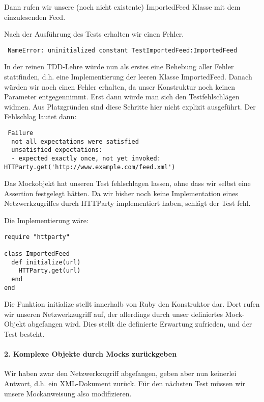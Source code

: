 Dann rufen wir unsere (noch nicht existente) ImportedFeed Klasse mit dem einzulesenden Feed.
\tddred

Nach der Ausführung des Tests erhalten wir einen Fehler. 
\begin{lstlisting}
 NameError: uninitialized constant TestImportedFeed:ImportedFeed
\end{lstlisting}
In der reinen TDD-Lehre würde nun als erstes eine Behebung aller Fehler stattfinden, d.h. eine Implementierung der leeren Klasse ImportedFeed. Danach würden wir noch einen Fehler erhalten, da unser Konstruktur noch keinen Parameter entgegennimmt. Erst dann würde man sich den Testfehlschlägen widmen. Aus Platzgründen sind diese Schritte hier nicht explizit ausgeführt. Der Fehlschlag lautet dann:

\begin{lstlisting}
 Failure
  not all expectations were satisfied
  unsatisfied expectations:
  - expected exactly once, not yet invoked: HTTParty.get('http://www.example.com/feed.xml')
\end{lstlisting}
Das Mockobjekt hat unseren Test fehlschlagen lassen, ohne dass wir selbst eine Assertion festgelegt hätten. Da wir bisher noch keine Implementation eines Netzwerkzugriffes durch HTTParty implementiert haben, schlägt der Test fehl.

Die Implementierung wäre:
\begin{lstlisting}
require "httparty"

class ImportedFeed
  def initialize(url)
    HTTParty.get(url)
  end
end
\end{lstlisting}
\tddgreen
Die Funktion initialize stellt innerhalb von Ruby den Konstruktor dar. Dort rufen wir unseren Netzwerkzugriff auf, der allerdings durch unser definiertes Mock-Objekt abgefangen wird. Dies stellt die definierte Erwartung zufrieden, und der Test besteht.



\paragraph{2. Komplexe Objekte durch Mocks zurückgeben}

Wir haben zwar den Netzwerkzugriff abgefangen, geben aber nun keinerlei Antwort, d.h. ein XML-Dokument zurück. Für den nächsten Test müssen wir unsere Mockanweisung also modifizieren.

